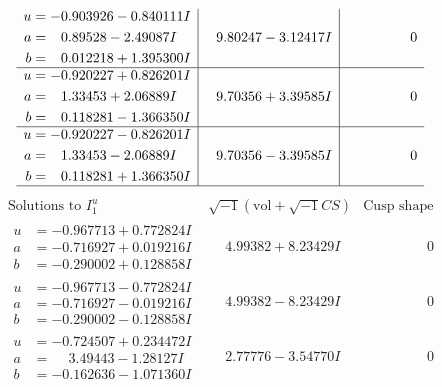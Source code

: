 \documentclass[1p]{elsarticle_modified}
\theoremstyle{definition}
\newcommand{\I}{\sqrt{-1}}
\begin{document}
$$\begin{array}{c|c|c}
\begin{aligned}
u &= -0.903926 - 0.840111 I \\
a &= \phantom{-}0.89528 - 2.49087 I \\
b &= \phantom{-}0.012218 + 1.395300 I\end{aligned}
 & \phantom{-}9.80247 - 3.12417 I & \phantom{-0.000000 } 0 \\ \hline\begin{aligned}
u &= -0.920227 + 0.826201 I \\
a &= \phantom{-}1.33453 + 2.06889 I \\
b &= \phantom{-}0.118281 - 1.366350 I\end{aligned}
 & \phantom{-}9.70356 + 3.39585 I & \phantom{-0.000000 } 0 \\ \hline\begin{aligned}
u &= -0.920227 - 0.826201 I \\
a &= \phantom{-}1.33453 - 2.06889 I \\
b &= \phantom{-}0.118281 + 1.366350 I\end{aligned}
 & \phantom{-}9.70356 - 3.39585 I & \phantom{-0.000000 } 0\\
 \hline 
 \end{array}$$\newpage$$\begin{array}{c|c|c}  
\text{Solutions to }I^u_{1}& \I (\text{vol} + \sqrt{-1}CS) & \text{Cusp shape}\\
 \hline 
\begin{aligned}
u &= -0.967713 + 0.772824 I \\
a &= -0.716927 + 0.019216 I \\
b &= -0.290002 + 0.128858 I\end{aligned}
 & \phantom{-}4.99382 + 8.23429 I & \phantom{-0.000000 } 0 \\ \hline\begin{aligned}
u &= -0.967713 - 0.772824 I \\
a &= -0.716927 - 0.019216 I \\
b &= -0.290002 - 0.128858 I\end{aligned}
 & \phantom{-}4.99382 - 8.23429 I & \phantom{-0.000000 } 0 \\ \hline\begin{aligned}
u &= -0.724507 + 0.234472 I \\
a &= \phantom{-}3.49443 - 1.28127 I \\
b &= -0.162636 - 1.071360 I\end{aligned}
 & \phantom{-}2.77776 - 3.54770 I & \phantom{-0.000000 } 0 \\ \hline\begin{aligned}

\end{aligned}
\end{array}$$
\end{document}

